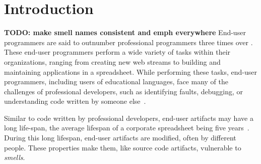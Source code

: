 \documentclass{sig-alternate}
\newcommand{\todo}[1]{\textbf{TODO: #1}}
\newcommand{\ms}{LEGO MINDSTORMS EV3}
\begin{document}
\begin{abstract}
In the workforce today, millions of people program without degrees or professional training in software development. 
These end-user programmers perform a variety of tasks, from combining web information to building models to support business decisions. Software engineering research into code smells has traditionally focused on professionally used object-oriented programming languages, yet these end-user domains and languages also suffer from code smells. 

In this work, we explore recent research in two distinct end-user domains and languages: spreadsheets in Microsoft Excel and web mashups in Yahoo Pipes. Based on existing OO-smells and their applications to these two end-user domains, we distill a catalog of generic end-user smells. 
We demonstrate the broad applicability of the catalog by mapping the smells to two additional end-user languages not previously targeted by smell detection and refactoring research, both aimed at education: \ms~and Microsoft's Kodu. The results of this application show that  OO inspired smells indeed occur in educational end-user languages and are present in 88\% and 93\% of the EV3 and Kodu programs, respectively. Most commonly we find that programs are plagued with lazy class, duplication, and dead code smells, with the duplication smells being present in nearly 2/3 of programs in each language. We conclude the paper by proposing new end-user smells inspired by the educational languages, moving beyond the OO paradigm. 
\end{abstract}


\section{Introduction}
\todo{make smell names consistent and emph everywhere}
End-user programmers are said to outnumber  professional programmers three times over \cite{Scaf2005}.
These end-user programmers perform a wide variety of tasks within their organizations, ranging from creating new web streams to building and maintaining applications in a spreadsheet. While performing these tasks, end-user programmers, including users of educational languages,  face many of the challenges of professional developers, such as identifying faults, debugging, or understanding code written by someone else~\cite{Ko2011}. 

Similar to code written by professional developers, end-user artifacts may have a long life-span, the average lifespan of a corporate spreadsheet being five years~\cite{Hermans2011}. During this long lifespan, end-user artifacts are modified, often by different people.
These properties make them, like source code artifacts, vulnerable to \emph{smells}. 
\end{document}
